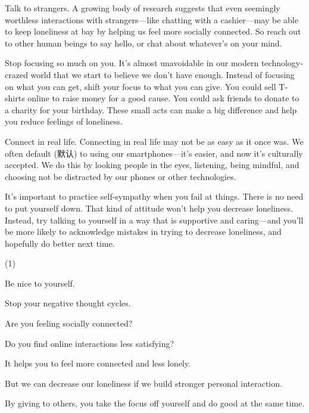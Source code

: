 \documentclass{英语试卷}
\begin{document}
\par Talk to strangers. A growing body of research suggests that even seemingly worthless interactions with strangers—like chatting with a cashier—may be able to keep loneliness at bay by helping us feel more socially connected. So reach out to other human beings to say hello, or chat about whatever's on your mind. \par
\par Stop focusing so much on you. It's almost unavoidable in our modern technology-crazed world that we start to believe we don't have enough. Instead of focusing on what you can get, shift your focus to what you can give. You could sell T-shirts online to raise money for a good cause. You could ask friends to donate to a charity for your birthday.  These small acts can make a big difference and help you reduce feelings of loneliness.\par
\par Connect in real life. Connecting in real life may not be as easy as it once was. We often default (默认) to using our smartphones—it's easier, and now it's culturally accepted.  We do this by looking people in the eyes, listening, being mindful, and choosing not be distracted by our phones or other technologies.\par
\par {} It's important to practice self-sympathy when you fail at things. There is no need to put yourself down. That kind of attitude won't help you decrease loneliness. Instead, try talking to yourself in a way that is supportive and caring—and you'll be more likely to acknowledge mistakes in trying to decrease loneliness, and hopefully do better next time.\par
\begin{choices}(1)
  \item Be nice to yourself.
  \item Stop your negative thought cycles.
  \item Are you feeling socially connected?
  \item Do you find online interactions less satisfying?
  \item It helps you to feel more connected and less lonely.
  \item But we can decrease our loneliness if we build stronger personal interaction.
  \item By giving to others, you take the focus off yourself and do good at the same time.
\end{choices}
\end{document}
